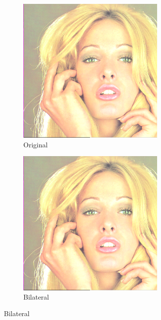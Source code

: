 \documentclass[12pt]{article}
\begin{document}
	\begin{figure}
		\centering
		\begin{subfigure}{0.4\textwidth}
			\centering
			\includegraphics[width=0.8\textwidth]{tiffany/tiffany.png}
			\caption{Original}
		\end{subfigure}
		\begin{subfigure}{0.4\textwidth}
			\centering
			\includegraphics[width=0.8\textwidth]{tiffany/tiffanytiffBilateralFilter.png}
			\caption{Bilateral}
		\end{subfigure}
		

\end{figure}
\end{document}
